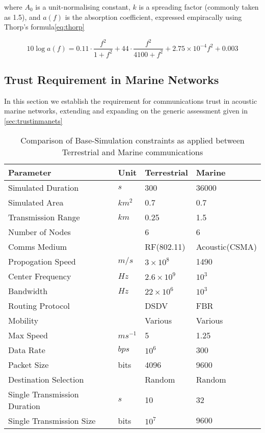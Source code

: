 \documentclass[runningheads,a4paper]{llncs}
\begin{document}
where $A_0$ is a unit-normalising constant, $k$ is a spreading factor (commonly taken as 1.5), and $a(f)$ is the absorption coefficient, expressed empiracally using Thorp's formula\ref{eq:thorp}


\begin{equation}
  \label{eq:thorp}
  10 \log a(f) = 0.11 \cdot \frac{f^2}{1+f^2} + 44\cdot\frac{f^2}{4100+f^2}+ 2.75\times10^{-4} f^2 + 0.003
\end{equation}



\subsection{Trust Requirement in Marine Networks}

In this section we establish the requirement for communications trust in acoustic marine networks, extending and expanding on the generic assessment given in \ref{sec:trustinmanets}

\begin{table}[h]
  \caption{Comparison of Base-Simulation constraints as applied between Terrestrial and Marine communications} \label{tab:simconstraints}
  \begin{center}
    \begin{tabular}{l l l l}

      Parameter & Unit & Terrestrial & Marine \\
      \hline
      Simulated Duration & $s$ & 300 & 36000\\
      Simulated Area & $km^2$ & 0.7 & 0.7 \\
      Transmission Range & $km$ & 0.25 & 1.5 \\
      Number of Nodes & & 6 & 6 \\
      Comms Medium & & RF(802.11) & Acoustic(CSMA)\\
      Propogation Speed& $m/s$ & $3\times10^8$ & 1490\\
      Center Frequency& $Hz$ & $2.6\times10^9$ & $10^3$ \\
      Bandwidth& $Hz$ & $22\times10^6$ & $10^3$\\
      Routing Protocol & & DSDV & FBR \\
      Mobility & & Various & Various \\
      Max Speed & $ms^{-1}$ & 5 & 1.25 \\
      Data Rate & $bps$ & $10^6$ & 300 \\
      Packet Size & bits & 4096 & 9600 \\
      Destination Selection & & Random & Random\\
      Single Transmission Duration & $s$ & 10 & 32 \\
      Single Transmission Size & bits & $10^7$ & $9600$ \\
    \end{tabular}
  \end{center}
\end{table}
\end{document}
